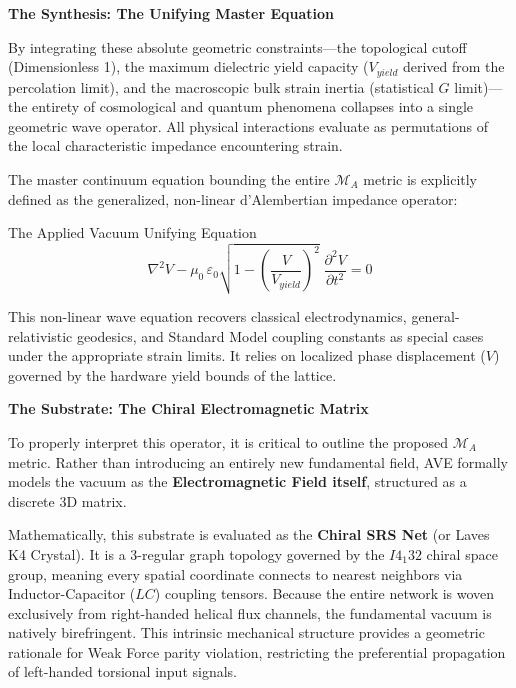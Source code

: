 \vspace{1.5em}
\noindent \textbf{The Synthesis: The Unifying Master Equation}

\noindent By integrating these absolute geometric constraints—the topological cutoff (Dimensionless 1), the maximum dielectric yield capacity ($V_{yield}$ derived from the percolation limit), and the macroscopic bulk strain inertia (statistical $G$ limit)—the entirety of cosmological and quantum phenomena collapses into a single geometric wave operator. All physical interactions evaluate as permutations of the local characteristic impedance encountering strain. 

The master continuum equation bounding the entire $\mathcal{M}_A$ metric is explicitly defined as the generalized, non-linear d'Alembertian impedance operator:
\begin{resultbox}{The Applied Vacuum Unifying Equation}
\begin{equation}
    \nabla^2 V - \mu_0 \, \varepsilon_0 \sqrt{1 - \left(\frac{V}{V_{yield}}\right)^2} \;\frac{\partial^2 V}{\partial t^2} = 0
\end{equation}
\end{resultbox}

\noindent This non-linear wave equation recovers classical electrodynamics, general-relativistic geodesics, and Standard Model coupling constants as special cases under the appropriate strain limits. It relies on localized phase displacement ($V$) governed by the hardware yield bounds of the lattice.

\vspace{1.5em}
\noindent \textbf{The Substrate: The Chiral Electromagnetic Matrix}

\noindent To properly interpret this operator, it is critical to outline the proposed $\mathcal{M}_A$ metric. Rather than introducing an entirely new fundamental field, AVE formally models the vacuum as the \textbf{Electromagnetic Field itself}, structured as a discrete 3D matrix. 

Mathematically, this substrate is evaluated as the \textbf{Chiral SRS Net} (or Laves K4 Crystal). It is a 3-regular graph topology governed by the $I4_1 32$ chiral space group, meaning every spatial coordinate connects to nearest neighbors via Inductor-Capacitor ($LC$) coupling tensors. Because the entire network is woven exclusively from right-handed helical flux channels, the fundamental vacuum is natively birefringent. This intrinsic mechanical structure provides a geometric rationale for Weak Force parity violation, restricting the preferential propagation of left-handed torsional input signals.

